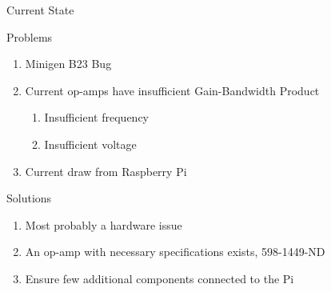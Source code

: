 \begin{frame}{Current State}
  \begin{block}{Problems}
    \begin{enumerate}
      \item Minigen B23 Bug
      \item Current op-amps have insufficient Gain-Bandwidth Product
        \begin{enumerate}
        \item Insufficient frequency
        \item Insufficient voltage
        \end{enumerate}
      \item Current draw from Raspberry Pi
    \end{enumerate}
  \end{block}

  \begin{block}{Solutions}
    \begin{enumerate}
      \item Most probably a hardware issue
      \item An op-amp with necessary specifications exists, 598-1449-ND
      \item Ensure few additional components connected to the Pi
    \end{enumerate}
  \end{block}
\end{frame}

